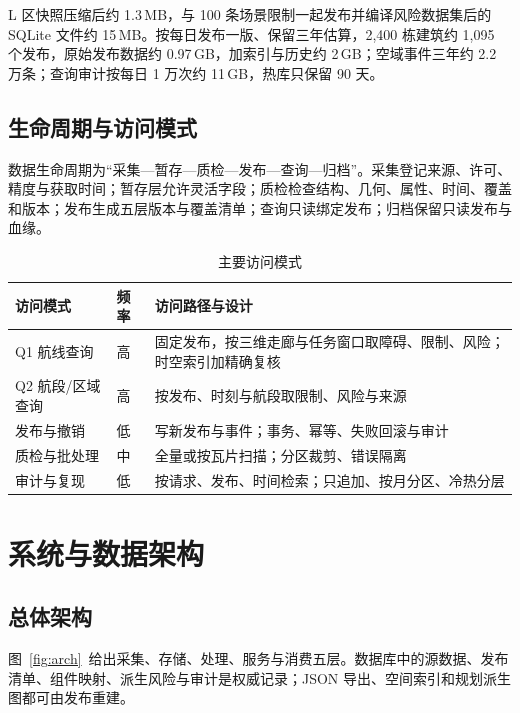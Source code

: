 \documentclass[a4paper,11pt,UTF8]{ctexart}
\begin{document}
L 区快照压缩后约 1.3\,MB，与 100 条场景限制一起发布并编译风险数据集后的 SQLite 文件约 15\,MB。按每日发布一版、保留三年估算，2,400 栋建筑约 1,095 个发布，原始发布数据约 0.97\,GB，加索引与历史约 2\,GB；空域事件三年约 2.2 万条；查询审计按每日 1 万次约 11\,GB，热库只保留 90 天。

\subsection{生命周期与访问模式}

数据生命周期为“采集—暂存—质检—发布—查询—归档”。采集登记来源、许可、精度与获取时间；暂存层允许灵活字段；质检检查结构、几何、属性、时间、覆盖和版本；发布生成五层版本与覆盖清单；查询只读绑定发布；归档保留只读发布与血缘。

\begin{table}[!htbp]\centering\small
\caption{主要访问模式}
\begin{tabularx}{\textwidth}{L{2.6cm}L{1cm}Y}
\toprule
访问模式 & 频率 & 访问路径与设计 \\
\midrule
Q1 航线查询 & 高 & 固定发布，按三维走廊与任务窗口取障碍、限制、风险；时空索引加精确复核 \\
Q2 航段/区域查询 & 高 & 按发布、时刻与航段取限制、风险与来源 \\
发布与撤销 & 低 & 写新发布与事件；事务、幂等、失败回滚与审计 \\
质检与批处理 & 中 & 全量或按瓦片扫描；分区裁剪、错误隔离 \\
审计与复现 & 低 & 按请求、发布、时间检索；只追加、按月分区、冷热分层 \\
\bottomrule
\end{tabularx}
\end{table}

\section{系统与数据架构}\label{sec:arch}

\subsection{总体架构}

图~\ref{fig:arch}~给出采集、存储、处理、服务与消费五层。数据库中的源数据、发布清单、组件映射、派生风险与审计是权威记录；JSON 导出、空间索引和规划派生图都可由发布重建。
\end{document}
